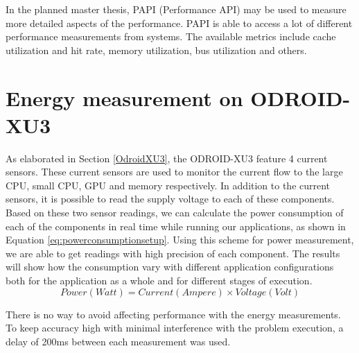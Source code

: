 In the planned master thesis, PAPI (Performance API) may be used to measure more detailed aspects of the performance.
PAPI is able to access a lot of different performance measurements from systems.
The available metrics include cache utilization and hit rate, memory utilization, bus utilization and others.

\section{Energy measurement on ODROID-XU3}
As elaborated in Section \ref{OdroidXU3}, the ODROID-XU3 feature 4 current sensors.
These current sensors are used to monitor the current flow to the large CPU, small CPU, GPU and memory respectively.
In addition to the current sensors, it is possible to read the supply voltage to each of these components.
Based on these two sensor readings, we can calculate the power consumption of each of the components in real time while running our applications, as shown in Equation \ref{eq:powerconsumptionsetup}.
Using this scheme for power measurement, we are able to get readings with high precision of each component.
The results will show how the consumption vary with different application configurations both for the application as a whole and for different stages of execution.
\begin{equation} \label{eq:powerconsumptionsetup}
  Power (Watt) = Current (Ampere) \times Voltage (Volt)
\end{equation}

There is no way to avoid affecting performance with the energy measurements.
To keep accuracy high with minimal interference with the problem execution, a delay of 200ms between each measurement was used.
